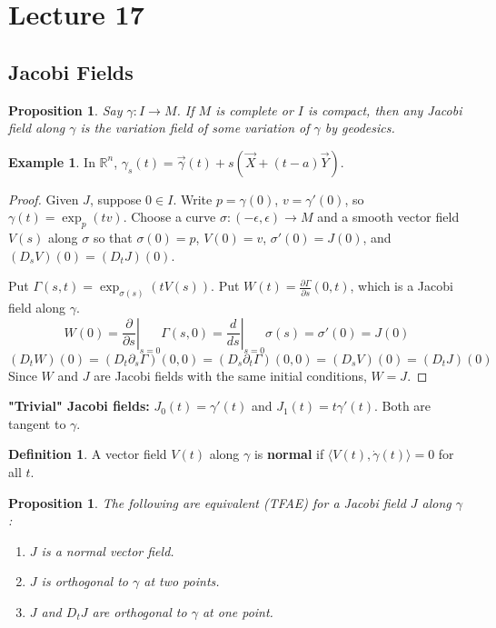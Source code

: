 \documentclass[11pt, a4paper]{article}
\theoremstyle{plain}
\newtheorem{proposition}[theorem]{Proposition}
\theoremstyle{definition}
\newtheorem{definition}[theorem]{Definition}
\newtheorem{example}[theorem]{Example}
\theoremstyle{remark}
\begin{document}
{
    \section{Lecture 17}

    \subsection{Jacobi Fields}

\begin{proposition}
Say $\gamma : I \to M$. If $M$ is complete or $I$ is compact, then any Jacobi field along $\gamma$ is the variation field of some variation of $\gamma$ by geodesics.
\end{proposition}

\begin{example}
In $\mathbb{R}^n$, $\gamma_s(t) = \vec{\gamma}(t) + s(\vec{X} + (t-a)\vec{Y})$.
\end{example}

\begin{proof}
Given $J$, suppose $0 \in I$. Write $p = \gamma(0)$, $v = \gamma'(0)$, so $\gamma(t) = \exp_p(tv)$.
Choose a curve $\sigma : (-\epsilon, \epsilon) \to M$ and a smooth vector field $V(s)$ along $\sigma$ so that $\sigma(0) = p$, $V(0) = v$, $\sigma'(0) = J(0)$, and $(D_s V)(0) = (D_t J)(0)$.

Put $\Gamma(s,t) = \exp_{\sigma(s)}(t V(s))$. Put $W(t) = \frac{\partial \Gamma}{\partial s}(0,t)$, which is a Jacobi field along $\gamma$.
\[ W(0) = \left. \frac{\partial}{\partial s} \right|_{s=0} \Gamma(s,0) = \left. \frac{d}{ds} \right|_{s=0} \sigma(s) = \sigma'(0) = J(0) \]
\[ (D_t W)(0) = (D_t \partial_s \Gamma)(0,0) = (D_s \partial_t \Gamma)(0,0) = (D_s V)(0) = (D_t J)(0) \]
Since $W$ and $J$ are Jacobi fields with the same initial conditions, $W = J$.
\end{proof}

\textbf{"Trivial" Jacobi fields:} $J_0(t) = \gamma'(t)$ and $J_1(t) = t\gamma'(t)$. Both are tangent to $\gamma$.

\begin{definition}
A vector field $V(t)$ along $\gamma$ is \textbf{normal} if $\langle V(t), \dot{\gamma}(t) \rangle = 0$ for all $t$.
\end{definition}

\begin{proposition}
The following are equivalent (TFAE) for a Jacobi field $J$ along $\gamma$:
\begin{enumerate}
    \item $J$ is a normal vector field.
    \item $J$ is orthogonal to $\gamma$ at two points.
    \item $J$ and $D_t J$ are orthogonal to $\gamma$ at one point.
\end{enumerate}
\end{proposition}

}
\end{document}
